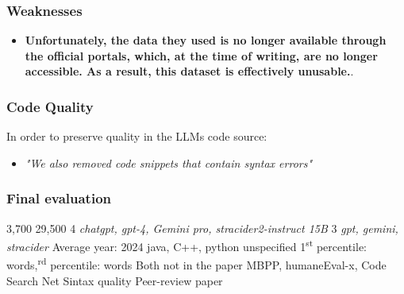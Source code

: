 \subsubsection*{Weaknesses}
\begin{itemize}
    \item \textbf{Unfortunately, the data they used is no longer available 
through the official portals, which, at the time of writing, 
are no longer accessible. As a result, this dataset is 
effectively unusable.}.
\end{itemize}



\subsubsection*{Code Quality}
In order to preserve quality in the LLMs code source:
\begin{itemize}
    \item \textit{"We also removed code snippets that contain syntax errors"}
\end{itemize}


\subsubsection*{Final evaluation}






\expandafter\def\csname SuhHumanCode\endcsname{3,700}
\expandafter\def\csname SuhLLMCode\endcsname{29,500}
\expandafter\def\csname SuhNumLLMs\endcsname{4 \textit{chatgpt, gpt-4, Gemini pro, stracider2-instruct 15B}}
\expandafter\def\csname SuhLLMDiversity\endcsname{3 \textit{gpt, gemini, stracider}}
\expandafter\def\csname SuhCurrentUse\endcsname{Average year: 2024}
\expandafter\def\csname SuhLanguages\endcsname{java, C++, python}
\expandafter\def\csname SuhCodeTypes\endcsname{unspecified}
\expandafter\def\csname SuhCodeSize\endcsname{1\textsuperscript{st} percentile:  words,\textsuperscript{rd} percentile:  words}
\expandafter\def\csname SuhCodeContext\endcsname{Both}
\expandafter\def\csname SuhPrompts\endcsname{not in the paper}
\expandafter\def\csname SuhSources\endcsname{MBPP, humaneEval-x, Code Search Net}
\expandafter\def\csname SuhCodeQuality\endcsname{Sintax quality}
\expandafter\def\csname SuhReliability\endcsname{Peer-review paper}




